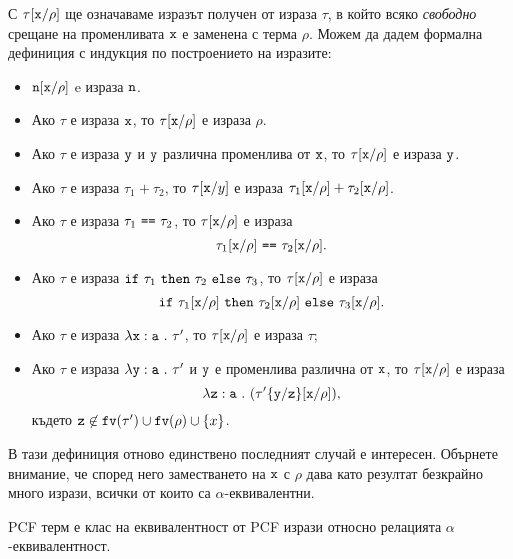 С $\tau[\texttt{x}/{\rho}]$ ще означаваме изразът получен от израза $\tau$, в който всяко \emph{свободно} срещане на променливата $\texttt{x}$
е заменена с терма $\rho$. Можем да дадем формална дефиниция с индукция по построението на изразите:
\begin{itemize}
\item
  $\texttt{n}[\texttt{x}/{\rho}]$ e израза $\texttt{n}$.
\item
  Ако $\tau$ е израза $\texttt{x}$, то $\tau[\texttt{x}/{\rho}]$ е израза $\rho$.
\item
  Ако $\tau$ е израза $\texttt{y}$ и $\texttt{y}$ различна променлива от $\texttt{x}$, то $\tau[\texttt{x}/{\rho}]$ е израза $\texttt{y}$.
\item
  Ако $\tau$ е израза $\tau_1 + \tau_2$, то
  $\tau[\texttt{x}/{y}]$ е израза $\tau_1[\texttt{x}/{\rho}] + \tau_2[\texttt{x}/{\rho}]$.
\item
  Ако $\tau$ е израза $\tau_1\ \texttt{==}\ \tau_2$, то $\tau[\texttt{x}/{\rho}]$ е израза
  \[\tau_1\subst{x}{\rho}\ \vv{==}\ \tau_2\subst{x}{\rho}.\]
\item
  Ако $\tau$ е израза $\texttt{if}\ \tau_1\ \texttt{then}\ \tau_2\ \texttt{else}\ \tau_3$, то $\tau[\texttt{x}/{\rho}]$ е израза
  \[\texttt{if}\ \tau_1[\texttt{x}/{\rho}]\ \texttt{then}\ \tau_2[\texttt{x}/{\rho}]\ \texttt{else}\ \tau_3[\texttt{x}/{\rho}].\]
\item
  Ако $\tau$ е израза $\lambda\texttt{x}:\texttt{a}\ .\ {\tau'}$, то
  $\tau[\texttt{x}/{\rho}]$ е израза $\tau$;
\item
  Ако $\tau$ е израза $\lambda\texttt{y}:\texttt{a}\ .\ {\tau'}$ и $\texttt{y}$ е променлива различна от $\texttt{x}$, то
  $\tau[\texttt{x}/{\rho}]$ е израза
  \[\lambda\texttt{z}:\texttt{a}\ .\ {(\tau'\{\texttt{y}/\texttt{z}\}[\texttt{x}/{\rho}])},\]
  където $\texttt{z} \not\in \texttt{fv}(\tau') \cup \texttt{fv}(\rho) \cup \{x\}$.
\end{itemize}

В тази дефиниция отново единствено последният случай е интересен.
Обърнете внимание, че според него заместването на $\texttt{x}$ с $\rho$ дава като резултат безкрайно много
изрази, всички от които са $\alpha$-еквивалентни.


PCF терм е клас на еквивалентност от PCF изрази относно релацията $\alpha$-еквивалентност.

